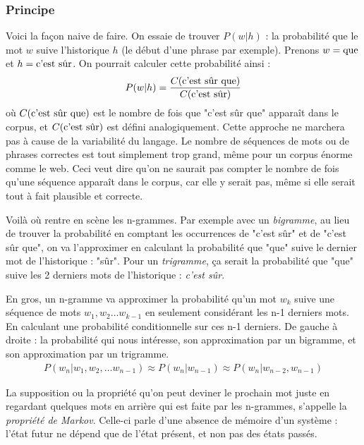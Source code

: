 \documentclass[11pt, a4paper]{report}
\begin{document}
  \subsubsection{Principe}
  Voici la façon naive de faire. On essaie de trouver $P(w|h)$ : la probabilité que le mot 
  $w$ suive l'historique $h$ (le début d'une phrase par exemple). Prenons $w = \textup{que}$ et 
  $h = \textup{c'est sûr}$. On pourrait calculer cette probabilité ainsi : 
  \begin{align}
    P(w|h) = \frac{C(\textup{c'est sûr que})}{C(\textup{c'est sûr})}
  \end{align}
  où $C(\textup{c'est sûr que})$ est le nombre de fois que "c'est sûr que" apparaît 
  dans le corpus, et $C(\textup{c'est sûr})$ est défini analogiquement. Cette approche 
  ne marchera pas à cause de la variabilité du langage. Le nombre de séquences de mots
  ou de phrases  
  correctes est tout simplement trop grand, même pour un corpus énorme comme le web.
  Ceci veut dire qu'on ne saurait pas compter le nombre de fois qu'une séquence apparaît
  dans le corpus, car elle y serait pas, même si elle serait tout à fait plausible et 
  correcte. 

  Voilà où rentre en scène les n-grammes. Par exemple avec un \textit{bigramme}, 
  au lieu de trouver la probabilité en comptant les occurrences de 
  "c'est sûr" et de "c'est sûr que", on va l'approximer en calculant la probabilité que "que" suive 
  le dernier mot de l'historique : "sûr". Pour un \textit{trigramme}, ça serait 
  la probabilité que "que" suive les 2 derniers mots de l'historique : \textit{c'est sûr}.
  
  En gros, un n-gramme va approximer la probabilité qu'un mot $w_k$ suive une séquence 
  de mots $w_{1}, w_{2} \dots w_{k-1}$ en seulement considérant les n-1 derniers mots. 
  En calculant une probabilité conditionnelle sur ces n-1 derniers. 
  De gauche à droite : la probabilité qui nous intéresse, son approximation par un bigramme, 
  et son approximation par un trigramme. 
  \begin{align}
    P(w_n|w_1, w_2, \dots w_{n-1}) \approx P(w_n|w_{n-1}) \approx P(w_n|w_{n-2}, w_{n-1})
  \end{align}

  La supposition ou la propriété qu'on peut deviner le prochain mot juste en regardant quelques mots en arrière 
  qui est faite par les n-grammes, s'appelle la \textit{propriété de Markov}. Celle-ci parle 
  d'une absence de mémoire d'un système : l'état futur ne dépend que de l'état présent, et 
  non pas des états passés. 
\end{document}
